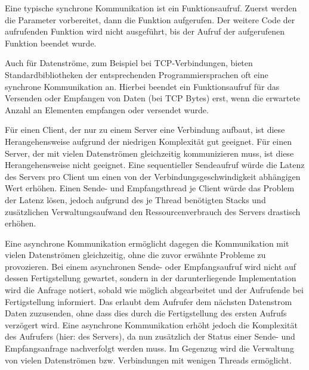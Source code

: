 Eine typische synchrone Kommunikation ist ein Funktionsaufruf.
Zuerst werden die Parameter vorbereitet, dann die Funktion aufgerufen.
Der weitere Code der aufrufenden Funktion wird nicht ausgeführt, bis der Aufruf der aufgerufenen Funktion beendet wurde.

Auch für Datenströme, zum Beispiel bei TCP-Verbindungen, bieten Standardbibliotheken der entsprechenden Programmiersprachen oft eine synchrone Kommunikation an.
Hierbei beendet ein Funktionsaufruf für das Versenden oder Empfangen von Daten (bei TCP Bytes) erst, wenn die erwartete Anzahl an Elementen empfangen oder versendet wurde.

Für einen Client, der nur zu einem Server eine Verbindung aufbaut, ist diese Herangehensweise aufgrund der niedrigen Komplexität gut geeignet.
Für einen Server, der mit vielen Datenströmen gleichzeitig kommunizieren muss, ist diese Herangehensweise nicht geeignet.
Eine sequentieller Sendeaufruf würde die Latenz des Servers pro Client um einen von der Verbindungsgeschwindigkeit abhängigen Wert erhöhen.
Einen Sende- und Empfangsthread je Client würde das Problem der Latenz lösen, jedoch aufgrund des je Thread benötigten Stacks und zusätzlichen Verwaltungsaufwand den Ressourcenverbrauch des Servers drastisch erhöhen.

Eine asynchrone Kommunikation ermöglicht dagegen die Kommunikation mit vielen Datenströmen gleichzeitig, ohne die zuvor erwähnte Probleme zu provozieren.
Bei einem asynchronen Sende- oder Empfangsaufruf wird nicht auf dessen Fertigstellung gewartet, sondern in der darunterliegende Implementation wird die Anfrage notiert, sobald wie möglich abgearbeitet und der Aufrufende bei Fertigstellung informiert.
Das erlaubt dem Aufrufer dem nächsten Datenstrom Daten zuzusenden, ohne dass dies durch die Fertigstellung des ersten Aufrufs verzögert wird.
Eine asynchrone Kommunikation erhöht jedoch die Komplexität des Aufrufers (hier: des Servers), da nun zusätzlich der Status einer Sende- und Empfangsanfrage nachverfolgt werden muss.
Im Gegenzug wird die Verwaltung von vielen Datenströmen bzw. Verbindungen mit wenigen Threads ermöglicht.


